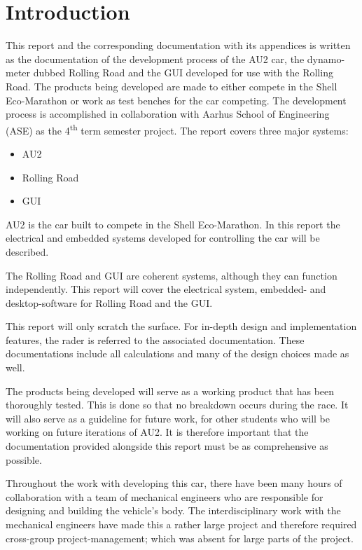 \chapter{Introduction}
This report and the corresponding documentation with its appendices is written as the documentation of the development process of the AU2 car, the dynamo-meter dubbed Rolling Road and the GUI developed for use with the Rolling Road. The products being developed are made to either compete in the Shell Eco-Marathon or work as test benches for the car competing. The development process is accomplished in collaboration with Aarhus School of Engineering (ASE) as the 4\textsuperscript{th} term semester project. The report covers three major systems:

\begin{itemize}
	\item{AU2}
	\item{Rolling Road}
	\item{GUI}
\end{itemize}

AU2 is the car built to compete in the Shell Eco-Marathon. In this report the electrical and embedded systems developed for controlling the car will be described. 

The Rolling Road and GUI are coherent systems, although they can function independently. This report will cover the electrical system, embedded- and desktop-software for Rolling Road and the GUI. 

This report will only scratch the surface. For in-depth design and implementation features, the rader is referred to the associated documentation. These documentations include all calculations and many of the design choices made as well.  

The products being developed will serve as a working product that has been thoroughly tested. This is done so that no breakdown occurs during the race. It will also serve as a guideline for future work, for other students who will be working on future iterations of AU2. It is therefore important that the documentation provided alongside this report must be as comprehensive as possible.

Throughout the work with developing this car, there have been many hours of collaboration with a team of mechanical engineers who are responsible for designing and building the vehicle's body. The interdisciplinary work with the mechanical engineers have made this a rather large project and therefore required cross-group project-management; which was absent for large parts of the project. 

